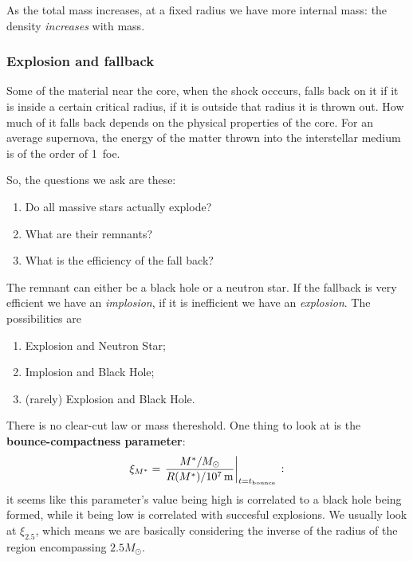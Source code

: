 \documentclass[main.tex]{subfiles}
\begin{document}

 
As the total mass increases, at a fixed radius we have more internal mass: the density \emph{increases} with mass. 

\subsubsection{Explosion and fallback}

Some of the material near the core, when the shock occcurs, falls back on it if it is inside a certain critical radius, if it is outside that radius it is thrown out. 
How much of it falls back depends on the physical properties of the core.
For an average supernova, the energy of the matter thrown into the interstellar medium is of the order of \SI{1}{foe}.

So, the questions we ask are these: 
\begin{enumerate}
  \item Do all massive stars actually explode?
  \item What are their remnants?
  \item What is the efficiency of the fall back?
\end{enumerate}

The remnant can either be a black hole or a neutron star.
If the fallback is very efficient we have an \emph{implosion}, if it is inefficient we have an \emph{explosion}.
The possibilities are 
\begin{enumerate}
    \item Explosion and Neutron Star;
    \item Implosion and Black Hole;
    \item (rarely) Explosion and Black Hole.
\end{enumerate}

There is no clear-cut law or mass thereshold. One thing to look at is the \textbf{bounce-compactness parameter}: 
%
\begin{align}
  \xi_{M^*} = \eval{\frac{M^{*} / M_{\odot}}{R(M^{*}) / \SI{e7}{m}}}_{t = t _{\text{bounce}}}
\,:
\end{align}
%
it seems like this parameter's value being high is correlated to a black hole being formed, while it being low is correlated with succesful explosions.
We usually look at \(\xi_{2.5}\), which means we are basically considering the inverse of the radius of the region encompassing \(2.5 M_{\odot}\).
\end{document}
